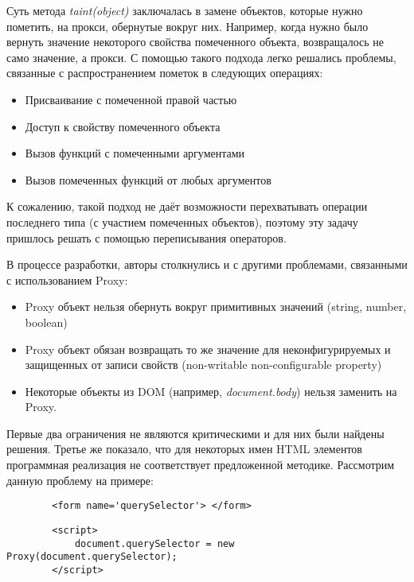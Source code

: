 	Суть метода \textit{taint(object)} заключалась в замене объектов, которые нужно пометить, на прокси, обернутые вокруг них. Например, когда нужно было вернуть значение некоторого свойства помеченного объекта, возвращалось не само значение, а прокси. С помощью такого подхода легко решались проблемы, связанные с распространением пометок в следующих операциях:
	
	\bigskip
	\begin{itemize}
		\item Присваивание с помеченной правой частью
		\item Доступ к свойству помеченного объекта
		\item Вызов функций с помеченными аргументами
		\item Вызов помеченных функций от любых аргументов
	\end{itemize}


	К сожалению, такой подход не даёт возможности перехватывать операции последнего типа (с участием помеченных объектов), поэтому эту задачу пришлось решать с помощью переписывания операторов.


	В процессе разработки, авторы столкнулись и с другими проблемами, связанными с использованием Proxy:

	\bigskip
	\begin{itemize}
		\item Proxy объект нельзя обернуть вокруг примитивных значений (string, number, boolean)
		\item Proxy объект обязан возвращать то же значение для неконфигурируемых и защищенных от записи свойств (non-writable non-configurable property)
		\item Некоторые объекты из DOM (например, \textit{document.body}) нельзя заменить на Proxy.
	\end{itemize}


	Первые два ограничения не являются критическими и для них были найдены решения. Третье же показало, что для некоторых имен HTML элементов программная реализация не соответствует предложенной методике. Рассмотрим данную проблему на примере:

	\begin{lstlisting}
		<form name='querySelector'> </form>
	\end{lstlisting}

	\begin{lstlisting}
		<script>
			document.querySelector = new Proxy(document.querySelector);
		</script>
	\end{lstlisting}

